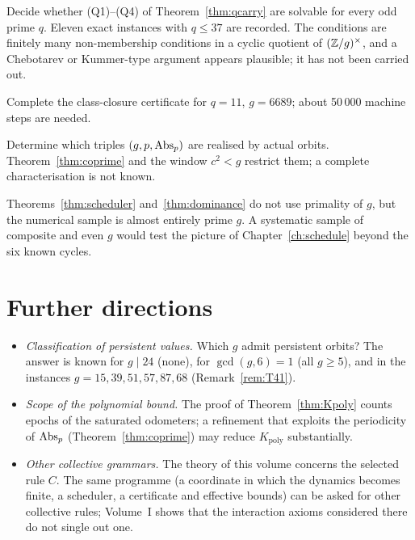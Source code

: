 \begin{problem}
Decide whether (Q1)--(Q4) of Theorem~\ref{thm:qcarry} are solvable for every odd prime \(q\). Eleven exact instances with \(q\le37\) are recorded. The conditions are finitely many non-membership conditions in a cyclic quotient of \((\mathbb{Z}/g)^\times\), and a Chebotarev or Kummer-type argument appears plausible; it has not been carried out.
\end{problem}

\begin{problem}[The case \(q=11\), \(g=6689\)]
Complete the class-closure certificate for \(q=11\), \(g=6689\); about 50\,000 machine steps are needed.
\end{problem}

\begin{problem}
Determine which triples \((g,p,\operatorname{Abs}_p)\) are realised by actual orbits. Theorem~\ref{thm:coprime} and the window \(c^2<g\) restrict them; a complete characterisation is not known.
\end{problem}

\begin{problem}
Theorems~\ref{thm:scheduler} and~\ref{thm:dominance} do not use primality of \(g\), but the numerical sample is almost entirely prime \(g\). A systematic sample of composite and even \(g\) would test the picture of Chapter~\ref{ch:schedule} beyond the six known cycles.
\end{problem}

\section*{Further directions}

\begin{itemize}
\item \emph{Classification of persistent values.} Which \(g\) admit persistent orbits? The answer is known for \(g\mid24\) (none), for \(\gcd(g,6)=1\) (all \(g\ge5\)), and in the instances \(g=15,39,51,57,87,68\) (Remark~\ref{rem:T41}).
\item \emph{Scope of the polynomial bound.} The proof of Theorem~\ref{thm:Kpoly} counts epochs of the saturated odometers; a refinement that exploits the periodicity of \(\operatorname{Abs}_p\) (Theorem~\ref{thm:coprime}) may reduce \(K_{\mathrm{poly}}\) substantially.
\item \emph{Other collective grammars.} The theory of this volume concerns the selected rule \(C\). The same programme (a coordinate in which the dynamics becomes finite, a scheduler, a certificate and effective bounds) can be asked for other collective rules; Volume~I shows that the interaction axioms considered there do not single out one.
\end{itemize}
